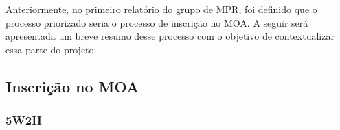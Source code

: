Anteriormente, no primeiro relatório do grupo de MPR, foi definido que o processo priorizado seria o processo de inscrição no MOA. A seguir será apresentada um breve resumo desse processo com o objetivo de contextualizar essa parte do projeto:

\subsection[Inscrição no MOA]{Inscrição no MOA}
\label{subsec:contexto_processoMelhorar_inscricaoMOA}
	

	\subsubsection[5W2H]{5W2H}
	\label{subsubsec:contexto_processoMelhorar_inscricaoMOA_5w2h}
		